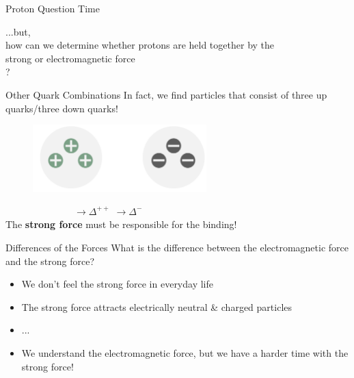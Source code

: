 \begin{frame}{Proton Question Time}
\begin{center} \Large
        ...but, \\ how can we determine whether protons are held together by the\\ strong or electromagnetic force\\? 
\end{center}

\end{frame}
\begin{frame}{Other Quark Combinations}
In fact, we find particles that consist of three up quarks/three down quarks!
    \begin{figure}[htb]
        \includegraphics[width=0.6\textwidth]{Figures Introductory Lecture/Standard Model/DeltaBaryons.png}
        \label{fig:strong_force_2}
    \end{figure}
    $\hspace{3cm}\rightarrow \Delta^{++}$\hspace{3cm} $\rightarrow \Delta^{-}$\\ \vspace{0.5cm}
     The \textbf{strong force} must be responsible for the binding!
\end{frame}
\begin{frame}{Differences of the Forces}
What is the difference between the electromagnetic force and the strong force?
\pause
\begin{itemize}
    \item We don't feel the strong force in everyday life
    \item The strong force attracts electrically neutral \& charged particles
    \item ...
    \item[\ding{43}] We understand the electromagnetic force, but we have a harder time with the strong force!
\end{itemize}
\end{frame}
